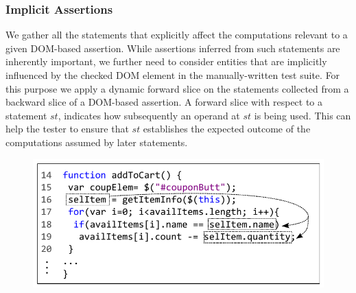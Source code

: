 \subsubsection{Implicit Assertions} \label{Sec:implicitAssertions}
We gather all the statements that explicitly affect the computations relevant to a given DOM-based assertion. While assertions inferred from such statements are inherently important, we further need to consider entities that are implicitly influenced by the checked DOM element in the manually-written test suite. For this purpose we apply a dynamic forward slice on the statements collected from a backward slice of a DOM-based assertion.
A forward slice with respect to a statement $st$,
indicates how subsequently an operand at $st$ is being used. This can help the tester to ensure that $st$ establishes the expected outcome of the computations assumed by later statements. 

\begin{figure}
  \centering
  \includegraphics[width=0.7\hsize]{fig/forwardSlicingExample}
   \vspace{0.2in} 
  \label{Fig:forwardSlicingExample}
\end{figure}

